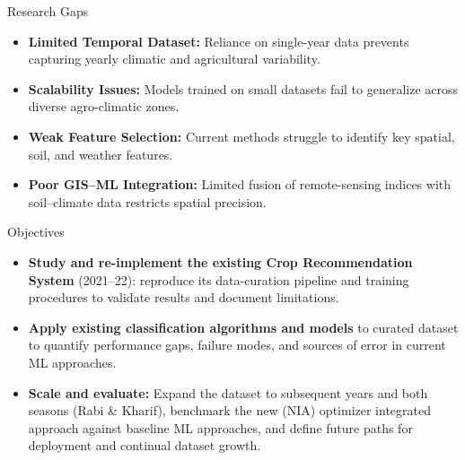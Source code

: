 \documentclass[aspectratio=169]{beamer}
\begin{document}

\begin{frame}{Research Gaps}
\begin{itemize}
    \item \textbf{Limited Temporal Dataset:} Reliance on single-year data prevents capturing yearly climatic and agricultural variability.

    \item \textbf{Scalability Issues:} Models trained on small datasets fail to generalize across diverse agro-climatic zones.

    \item \textbf{Weak Feature Selection:} Current methods struggle to identify key spatial, soil, and weather features.

    \item \textbf{Poor GIS–ML Integration:} Limited fusion of remote-sensing indices with soil–climate data restricts spatial precision.
\end{itemize}
\end{frame}

\begin{frame}{Objectives}
\begin{itemize}
    \item \textbf{Study and re-implement the existing Crop Recommendation System} (2021–22): reproduce its data-curation pipeline and training procedures to validate results and document limitations.
    \item \textbf{Apply existing classification algorithms and models} to curated dataset to quantify performance gaps, failure modes, and sources of error in current ML approaches.
    \item \textbf{Scale and evaluate:} Expand the dataset to subsequent years and both seasons (Rabi \& Kharif), benchmark the new (NIA) optimizer integrated approach against baseline ML approaches, and define future paths for deployment and continual dataset growth.
\end{itemize}
\end{frame}
\end{document}
